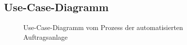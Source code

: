 \subsection{Use-Case-Diagramm}
\label{app:UseCase}
\begin{figure}[htb]
\centering
{}
\caption{Use-Case-Diagramm vom Prozess der automatisierten Auftragsanlage}
\end{figure}
